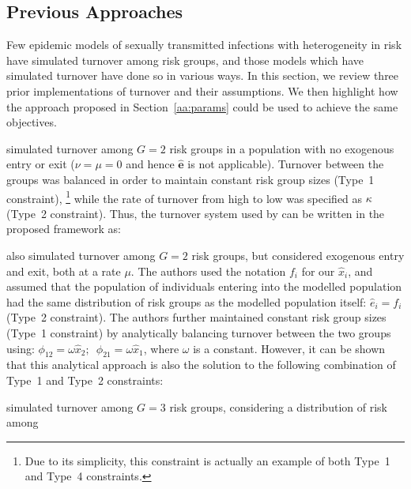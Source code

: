 \subsection{Previous Approaches}
\label{aa:prev-appr}
Few epidemic models of sexually transmitted infections
with heterogeneity in risk
have simulated turnover among risk groups,
and those models which have simulated turnover
have done so in various ways.
In this section, we review
three prior implementations of turnover and their assumptions.
We then highlight how the approach proposed in Section~\ref{aa:params}
could be used to achieve the same objectives.
\par
\citet{Stigum1994} simulated turnover among $G = 2$ risk groups
in a population with no exogenous entry or exit
($\nu = \mu = 0$ and hence $\bm{\hat{e}}$ is not applicable).
Turnover between the groups was balanced
in order to maintain constant risk group sizes (Type~1 constraint),%
\footnote{Due to its simplicity,
  this constraint is actually an example of both Type~1 and Type~4 constraints.}
while the rate of turnover from high to low
was specified as $\kappa$ (Type~2 constraint).
Thus, the turnover system used by \citet{Stigum1994} can be written
in the proposed framework as:

\par
\citet{Henry2015} also simulated turnover among $G = 2$ risk groups,
but considered exogenous entry and exit, both at a rate $\mu$.
The authors used the notation $f_i$ for our $\hat{x}_i$, and assumed that
the population of individuals entering into the modelled population
had the same distribution of risk groups as the modelled population itself:
$\hat{e}_i = f_i$ (Type~2 constraint).
The authors further maintained constant risk group sizes (Type~1 constraint)
by analytically balancing turnover between the two groups using:
$\phi_{12} = \omega \hat{x}_2 ;\enspace \phi_{21} = \omega \hat{x}_1$,
where $\omega$ is a constant.
However, it can be shown that this analytical approach
is also the solution to the following combination of Type~1 and Type~2 constraints:

\par
\citet{Eaton2014} simulated turnover among $G = 3$ risk groups,
considering a distribution of risk among
